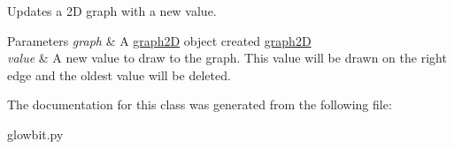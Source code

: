 Updates a 2D graph with a new value. 


\begin{DoxyParams}{Parameters}
{\em graph} & A \hyperlink{classglowbit_1_1glowbitMatrix_1_1graph2D}{graph2D} object created \hyperlink{classglowbit_1_1glowbitMatrix_1_1graph2D}{graph2D} \\
\hline
{\em value} & A new value to draw to the graph. This value will be drawn on the right edge and the oldest value will be deleted. \\
\hline
\end{DoxyParams}


The documentation for this class was generated from the following file\+:\begin{DoxyCompactItemize}
\item 
glowbit.\+py\end{DoxyCompactItemize}

